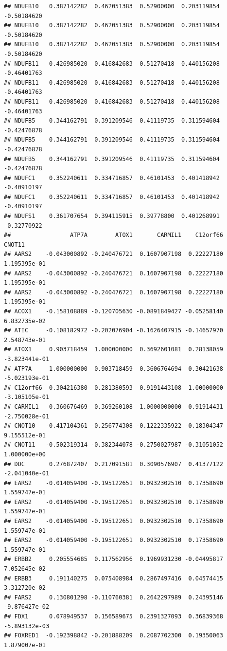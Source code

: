 \documentclass[
]{article}
\begin{document}
\begin{verbatim}
## NDUFB10   0.387142282  0.462051383  0.52900000  0.203119854 -0.50184620
## NDUFB10   0.387142282  0.462051383  0.52900000  0.203119854 -0.50184620
## NDUFB10   0.387142282  0.462051383  0.52900000  0.203119854 -0.50184620
## NDUFB11   0.426985020  0.416842683  0.51270418  0.440156208 -0.46401763
## NDUFB11   0.426985020  0.416842683  0.51270418  0.440156208 -0.46401763
## NDUFB11   0.426985020  0.416842683  0.51270418  0.440156208 -0.46401763
## NDUFB5    0.344162791  0.391209546  0.41119735  0.311594604 -0.42476878
## NDUFB5    0.344162791  0.391209546  0.41119735  0.311594604 -0.42476878
## NDUFB5    0.344162791  0.391209546  0.41119735  0.311594604 -0.42476878
## NDUFC1    0.352240611  0.334716857  0.46101453  0.401418942 -0.40910197
## NDUFC1    0.352240611  0.334716857  0.46101453  0.401418942 -0.40910197
## NDUFS1    0.361707654  0.394115915  0.39778800  0.401268991 -0.32770922
##                 ATP7A        ATOX1       CARMIL1    C12orf66        CNOT11
## AARS2    -0.043000892 -0.240476721  0.1607907198  0.22227180  1.195395e-01
## AARS2    -0.043000892 -0.240476721  0.1607907198  0.22227180  1.195395e-01
## AARS2    -0.043000892 -0.240476721  0.1607907198  0.22227180  1.195395e-01
## ACOX1    -0.158108889 -0.120705630 -0.0891849427 -0.05258140  6.832735e-02
## ATIC     -0.108182972 -0.202076904 -0.1626407915 -0.14657970  2.548743e-01
## ATOX1     0.903718459  1.000000000  0.3692601081  0.28138059 -3.823441e-01
## ATP7A     1.000000000  0.903718459  0.3606764694  0.30421638 -5.023193e-01
## C12orf66  0.304216380  0.281380593  0.9191443108  1.00000000 -3.105105e-01
## CARMIL1   0.360676469  0.369260108  1.0000000000  0.91914431 -2.750028e-01
## CNOT10   -0.417104361 -0.256774308 -0.1222335922 -0.18304347  9.155512e-01
## CNOT11   -0.502319314 -0.382344078 -0.2750027987 -0.31051052  1.000000e+00
## DDC       0.276872407  0.217091581  0.3090576907  0.41377122 -2.041040e-01
## EARS2    -0.014059400 -0.195122651  0.0932302510  0.17358690  1.559747e-01
## EARS2    -0.014059400 -0.195122651  0.0932302510  0.17358690  1.559747e-01
## EARS2    -0.014059400 -0.195122651  0.0932302510  0.17358690  1.559747e-01
## EARS2    -0.014059400 -0.195122651  0.0932302510  0.17358690  1.559747e-01
## ERBB2     0.205554685  0.117562956  0.1969931230 -0.04495817  7.052645e-02
## ERBB3     0.191140275  0.075408984  0.2867497416  0.04574415  3.312720e-02
## FARS2     0.130801298 -0.110760381  0.2642297989  0.24395146 -9.876427e-02
## FDX1      0.078949537  0.156589675  0.2391327093  0.36839368 -5.893132e-03
## FOXRED1  -0.192398842 -0.201888209  0.2087702300  0.19350063  1.879007e-01

\end{verbatim}
\end{document}
